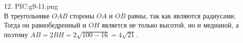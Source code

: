 12. {{PIC:g9-11.png}}\\
В треугольнике $OAB$ стороны $OA$ и $OB$ равны, так как являются радиусами. Тогда он равнобедренный и $OH$ является не только высотой, но и медианой, а поэтому $AB=2BH=2\sqrt{100-16}=4\sqrt{21}.$\\
